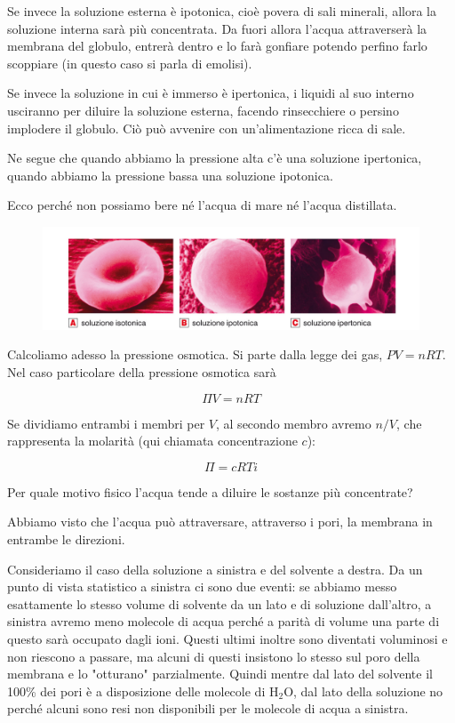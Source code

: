 Se invece la soluzione esterna è ipotonica, cioè povera di sali minerali, allora la soluzione interna sarà più concentrata. Da fuori allora l'acqua attraverserà la membrana del globulo, entrerà dentro e lo farà gonfiare potendo perfino farlo scoppiare (in questo caso si parla di emolisi).
 
Se invece la soluzione in cui è immerso è ipertonica, i liquidi al suo interno usciranno per diluire la soluzione esterna, facendo rinsecchiere o persino implodere il globulo. Ciò può avvenire con un'alimentazione ricca di sale.

Ne segue che quando abbiamo la pressione alta c'è una soluzione ipertonica, quando abbiamo la pressione bassa una soluzione ipotonica.

Ecco perché non possiamo bere né l'acqua di mare né l'acqua distillata.

\begin{figure}[htp]
    \centering
    \includegraphics[width=14cm]{immagini/sangue.png}
\end{figure}

Calcoliamo adesso la pressione osmotica.
Si parte dalla legge dei gas, $PV=nRT$. Nel caso particolare della pressione osmotica sarà

$$\Pi V=nRT$$

Se dividiamo entrambi i membri per $V$, al secondo membro avremo $n/V$, che rappresenta la molarità (qui chiamata concentrazione $c$):

$$ \Pi = c R T i$$

Per quale motivo fisico l'acqua tende a diluire le sostanze più concentrate?

Abbiamo visto che l'acqua può attraversare, attraverso i pori, la membrana in entrambe le direzioni.

Consideriamo il caso della soluzione a sinistra e del solvente a destra. Da un punto di vista statistico a sinistra ci sono due eventi: se abbiamo messo esattamente lo stesso volume di solvente da un lato e di soluzione dall'altro, a sinistra avremo meno molecole di acqua perché a parità di volume una parte di questo sarà occupato dagli ioni. Questi ultimi inoltre sono diventati voluminosi e non riescono a passare, ma alcuni di questi insistono lo stesso sul poro della membrana e lo "otturano" parzialmente. Quindi mentre dal lato del solvente il 100\% dei pori è a disposizione delle molecole di H$_2$O, dal lato della soluzione no perché alcuni sono resi non disponibili per le molecole di acqua a sinistra.

